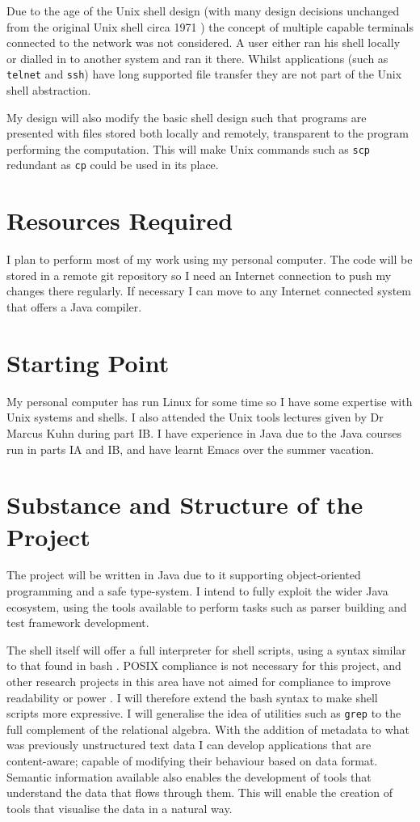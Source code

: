 \documentclass[12pt]{article}
\begin{document}
Due to the age of the Unix shell design (with many design decisions
unchanged from the original Unix shell circa 1971 \cite{firstshell})
the concept of multiple capable terminals connected to the network was
not considered. A user either ran his shell locally or dialled in to
another system and ran it there. Whilst applications (such as
\texttt{telnet} and \texttt{ssh}) have long supported file transfer
they are not part of the Unix shell abstraction.

My design will also modify the basic shell design such that programs are
presented with files stored both locally and remotely, transparent to
the program performing the computation. This will make Unix commands
such as \texttt{scp} redundant as \texttt{cp} could be used in its
place.

\section*{Resources Required}
I plan to perform most of my work using my personal computer. The code
will be stored in a remote git repository so I need an Internet
connection to push my changes there regularly. If necessary I can move
to any Internet connected system that offers a Java compiler.

\section*{Starting Point}
My personal computer has run Linux for some time so I have some
expertise with Unix systems and shells. I also attended the Unix tools
lectures given by Dr Marcus Kuhn during part IB. I have experience in
Java due to the Java courses run in parts IA and IB, and have learnt
Emacs over the summer vacation.

\section*{Substance and Structure of the Project}
The project will be written in Java due to it supporting
object-oriented programming and a safe type-system. I intend to fully
exploit the wider Java ecosystem, using the tools available to perform
tasks such as parser building and test framework development.

The shell itself will offer a full interpreter for shell scripts,
using a syntax similar to that found in bash \cite{bash}. POSIX
compliance \cite{posix} is not necessary for this project, and other
research projects in this area have not aimed for compliance to improve
readability \cite{fish} or power \cite{powershell}. I will therefore
extend the bash syntax to make shell scripts more expressive. I will
generalise the idea of utilities such as \texttt{grep} to the full
complement of the relational algebra. With the addition of metadata to
what was previously unstructured text data I can develop applications
that are content-aware; capable of modifying their behaviour based on
data format. Semantic information available also enables the
development of tools that understand the data that flows through
them. This will enable the creation of tools that visualise the data
in a natural way.
\end{document}
